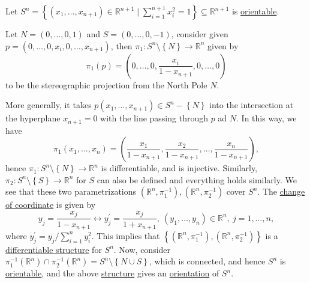 \begin{eg}
	Let \(S^n = \left\{ (x_1, \dots , x_{n+1})\in \mathbb{R} ^{n+1} \mid \sum_{i=1}^{n+1} x_i^2 = 1 \right\} \subseteq \mathbb{R} ^{n+1}\) is \hyperref[def:orientable]{orientable}.
\end{eg}
\begin{explanation}
	Let \(N=(0, \dots , 0, 1)\) and \(S=(0, \dots , 0, -1)\), consider given \(p=(0, \dots , 0, x_i, 0, \dots , x_{n+1} )\), then \(\pi _1\colon S^n \setminus \left\{ N \right\} \to \mathbb{R} ^n\) given by
	\[
		\pi _1(p) = \left( 0, \dots , 0, \frac{x_i}{1-x_{n+1}}, 0, \dots , 0 \right)
	\]
	to be the stereographic projection from the North Pole \(N\).

	\begin{center}
	\end{center}

	More generally, it takes \(p(x_1, \dots , x_{n+1})\in S^{n}-\left\{ N \right\}\) into the intersection at the hyperplane \(x_{n+1}= 0\) with the line passing through \(p\) ad \(N\). In this way, we have
	\[
		\pi _1(x_1, \dots , x_n) = \left( \frac{x_1}{1-x_{n+1}}, \frac{x_2}{1-x_{n+1}}, \dots , \frac{x_n}{1-x_{n+1}} \right),
	\]
	hence \(\pi _1\colon S^n \setminus \left\{ N \right\} \to \mathbb{R} ^n\) is differentiable, and is injective. Similarly, \(\pi _2\colon S^n \setminus \left\{ S \right\} \to \mathbb{R} ^n\) for \(S\) can also be defined and everything holds similarly. We see that these two parametrizations \((\mathbb{R} ^n, \pi _1 ^{-1} ), (\mathbb{R} ^n, \pi _2 ^{-1} )\) cover \(S^n\). The \hyperref[def:coordinate-transition]{change of coordinate} is given by
	\[
		y_j = \frac{x_j}{1 - x_{n+1}} \leftrightarrow y_j^\prime = \frac{x_j}{1 + x_{n+1}},\ (y_1, \dots , y_n) \in \mathbb{R} ^n,\ j = 1, \dots , n,
	\]
	where \(y_j ^\prime = y_j / \sum_{i=1}^n y_i ^2 \).	This implies that \(\left\{ (\mathbb{R} ^n, \pi _1 ^{-1} ), (\mathbb{R} ^n, \pi _2 ^{-1} ) \right\} \) is a \hyperref[def:smooth-structure]{differentiable structure} for \(S^n\). Now, consider \(\pi _1 ^{-1} (\mathbb{R} ^n) \cap \pi _2 ^{-1} (\mathbb{R} ^n) = S^n \setminus \left\{ N \cup S \right\} \), which is connected, and hence \(S^n\) is \hyperref[def:orientable]{orientable}, and the above \hyperref[def:smooth-structure]{structure} gives an \hyperref[def:orientation]{orientation} of \(S^n\).
\end{explanation}